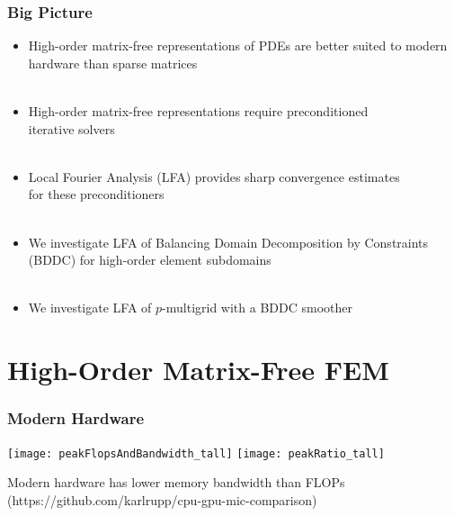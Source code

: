\documentclass{beamer}
\begin{document}
\begin{frame}
\begin{center}
\frametitle{Big Picture}

\begin{itemize}

\item High-order matrix-free representations of PDEs are better suited to modern hardware than sparse matrices\\

~\\

\item High-order matrix-free representations require preconditioned\\iterative solvers\\

~\\

\item Local Fourier Analysis (LFA) provides sharp convergence estimates\\for these preconditioners\\

~\\

\item We investigate LFA of Balancing Domain Decomposition by Constraints (BDDC) for high-order element subdomains\\

~\\

\item We investigate LFA of $p$-multigrid with a BDDC smoother

\end{itemize}

\end{center}
\end{frame}

\section{High-Order Matrix-Free FEM}

\begin{frame}
\begin{center}
\frametitle{Modern Hardware}

\texttt{[image: peakFlopsAndBandwidth\_tall]}
\hspace{1cm}
\texttt{[image: peakRatio\_tall]}

Modern hardware has lower memory bandwidth than FLOPs\\
(https://github.com/karlrupp/cpu-gpu-mic-comparison)

\end{center}
\end{frame}
\end{document}

